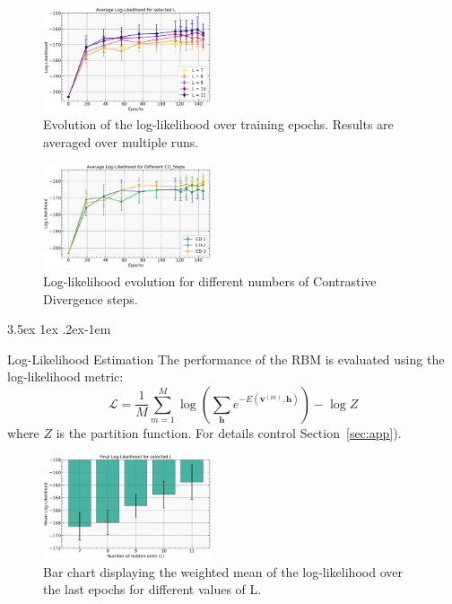 \documentclass[prl,twocolumn]{revtex4-1}
\makeatletter
\renewcommand{\subsection}{\@startsection{subsection}{2}{\z@}%
    {3.5ex \@plus 1ex \@minus .2ex}{-1em}%
    {\normalfont\bfseries\raggedright}}
\makeatother
\begin{document}
\begin{figure}[!tb]
	\includegraphics[width=0.44\textwidth]{L_of_epochs.jpg}
	\caption{Evolution of the log-likelihood over training epochs. Results are averaged over multiple runs.}
	\label{fig:L_of_epochs}
\end{figure}

\begin{figure}[!tb]
	\includegraphics[width=0.44\textwidth]{L_of_CD.png}
	\caption{Log-likelihood evolution for different numbers of Contrastive Divergence steps.}
	\label{fig:L_of_CD}
\end{figure}


\subsection{Log-Likelihood Estimation}
The performance of the RBM is evaluated using the log-likelihood metric:
\begin{equation}
	\mathcal{L} = \frac{1}{M}\sum_{m=1}^{M} \log \left(\sum_{\mathbf{h}} e^{-E(\mathbf{v}^{(m)},\mathbf{h})}\right) - \log Z
	\label{eq:loglikelihood}
\end{equation}
where $Z$ is the partition function. For details control Section~\ref{sec:app}). 

\begin{figure}[!tb]
	\includegraphics[width=0.44\textwidth]{L_of_L.jpg}
	\caption{Bar chart displaying the weighted mean of the log-likelihood over the last epochs for different values of L.}
	\label{fig:L_of_L}
\end{figure}
\end{document}
